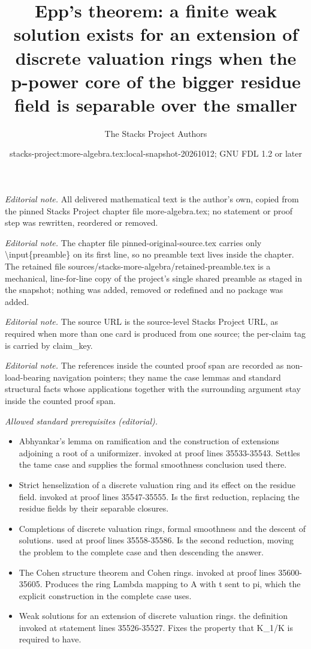 \documentclass[10pt,a4paper]{amsart}
\title{Epp's theorem: a finite weak solution exists for an extension of discrete valuation rings when the p-power core of the bigger residue field is separable over the smaller}
\author{The Stacks Project Authors}
\date{stacks-project:more-algebra.tex:local-snapshot-20261012; GNU FDL 1.2 or later}
\theoremstyle{plain}
\theoremstyle{definition}
\theoremstyle{remark}
\numberwithin{equation}{subsection}
\begin{document}
\maketitle
\setcounter{subsection}{1}
\noindent\textit{Editorial note.} All delivered mathematical text is the author's own, copied from the pinned Stacks Project chapter file more-algebra.tex; no statement or proof step was rewritten, reordered or removed.\par\medskip
\noindent\textit{Editorial note.} The chapter file pinned-original-source.tex carries only \textbackslash{}input\{preamble\} on its first line, so no preamble text lives inside the chapter. The retained file sources/stacks-more-algebra/retained-preamble.tex is a mechanical, line-for-line copy of the project's single shared preamble as staged in the snapshot; nothing was added, removed or redefined and no package was added.\par\medskip
\noindent\textit{Editorial note.} The source URL is the source-level Stacks Project URL, as required when more than one card is produced from one source; the per-claim tag is carried by claim\_key.\par\medskip
\noindent\textit{Editorial note.} The references inside the counted proof span are recorded as non-load-bearing navigation pointers; they name the case lemmas and standard structural facts whose applications together with the surrounding argument stay inside the counted proof span.\par\medskip
\noindent\textit{Allowed standard prerequisites (editorial).}\begin{itemize}
\item Abhyankar's lemma on ramification and the construction of extensions adjoining a root of a uniformizer. invoked at proof lines 35533-35543. Settles the tame case and supplies the formal smoothness conclusion used there.
\item Strict henselization of a discrete valuation ring and its effect on the residue field. invoked at proof lines 35547-35555. Is the first reduction, replacing the residue fields by their separable closures.
\item Completions of discrete valuation rings, formal smoothness and the descent of solutions. used at proof lines 35558-35586. Is the second reduction, moving the problem to the complete case and then descending the answer.
\item The Cohen structure theorem and Cohen rings. invoked at proof lines 35600-35605. Produces the ring Lambda mapping to A with t sent to pi, which the explicit construction in the complete case uses.
\item Weak solutions for an extension of discrete valuation rings. the definition invoked at statement lines 35526-35527. Fixes the property that K\_1/K is required to have.
\end{itemize}\medskip
\end{document}
